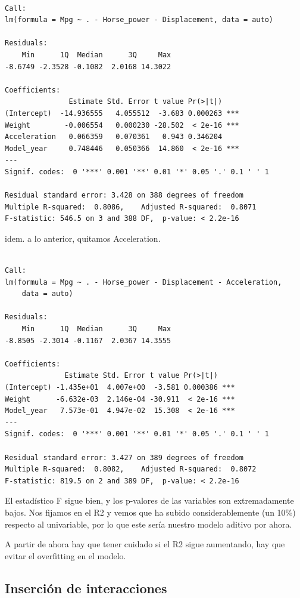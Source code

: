 \begin{verbatim}

Call:
lm(formula = Mpg ~ . - Horse_power - Displacement, data = auto)

Residuals:
    Min      1Q  Median      3Q     Max 
-8.6749 -2.3528 -0.1082  2.0168 14.3022 

Coefficients:
               Estimate Std. Error t value Pr(>|t|)    
(Intercept)  -14.936555   4.055512  -3.683 0.000263 ***
Weight        -0.006554   0.000230 -28.502  < 2e-16 ***
Acceleration   0.066359   0.070361   0.943 0.346204    
Model_year     0.748446   0.050366  14.860  < 2e-16 ***
---
Signif. codes:  0 '***' 0.001 '**' 0.01 '*' 0.05 '.' 0.1 ' ' 1

Residual standard error: 3.428 on 388 degrees of freedom
Multiple R-squared:  0.8086,    Adjusted R-squared:  0.8071 
F-statistic: 546.5 on 3 and 388 DF,  p-value: < 2.2e-16
\end{verbatim}

idem. a lo anterior, quitamos Acceleration.

\begin{verbatim}

Call:
lm(formula = Mpg ~ . - Horse_power - Displacement - Acceleration, 
    data = auto)

Residuals:
    Min      1Q  Median      3Q     Max 
-8.8505 -2.3014 -0.1167  2.0367 14.3555 

Coefficients:
              Estimate Std. Error t value Pr(>|t|)    
(Intercept) -1.435e+01  4.007e+00  -3.581 0.000386 ***
Weight      -6.632e-03  2.146e-04 -30.911  < 2e-16 ***
Model_year   7.573e-01  4.947e-02  15.308  < 2e-16 ***
---
Signif. codes:  0 '***' 0.001 '**' 0.01 '*' 0.05 '.' 0.1 ' ' 1

Residual standard error: 3.427 on 389 degrees of freedom
Multiple R-squared:  0.8082,    Adjusted R-squared:  0.8072 
F-statistic: 819.5 on 2 and 389 DF,  p-value: < 2.2e-16
\end{verbatim}

El estadístico F sigue bien, y los p-valores de las variables son
extremadamente bajos. Nos fijamos en el R2 y vemos que ha subido
considerablemente (un 10\%) respecto al univariable, por lo que este
sería nuestro modelo aditivo por ahora.

A partir de ahora hay que tener cuidado si el R2 sigue aumentando, hay
que evitar el overfitting en el modelo.

\subsection{Inserción de interacciones}

